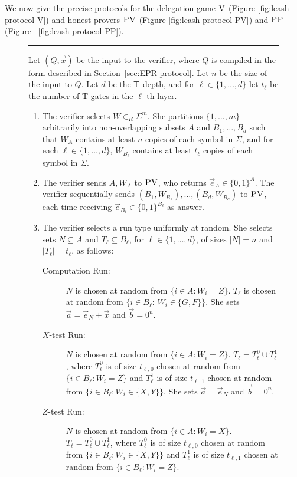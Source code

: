 We now give the precise protocols for the delegation game $\textsc{V}$ (Figure \ref{fig:leash-protocol-V})
and honest provers $\textsc{PV}$ (Figure \ref{fig:leash-protocol-PV}) and $\textsc{PP}$ (Figure~
\ref{fig:leash-protocol-PP}). 


\begin{figure}[H]
\rule{\textwidth}{0.5pt}
\justify 
Let $(Q,\vec{x})$ be the input to the verifier, where $Q$ is compiled in the form described in Section~\ref{sec:EPR-protocol}. Let $n$ be the size of the input to $Q$. Let $d$ be the $\sf T$-depth, and for $\ell\in\{1,\ldots,d\}$ let $t_\ell$ be the number of {\sf T} gates in the $\ell$-th layer. 
\begin{enumerate}
\item The verifier selects $W \in_R\Sigma^{m}$. She partitions $\{1,\ldots,m\}$ arbitrarily into non-overlapping subsets $A$ and $B_1,\ldots,B_d$ such that $W_A$ contains at least $n$ copies of each symbol in $\Sigma$, and for each $\ell\in\{1,\ldots,d\}$, $W_{B_\ell}$ contains at least $t_\ell$ copies of each symbol in $\Sigma$.
\item The verifier sends $A,W_A$ to $\textsc{PV}$, who returns $\vec{e}_A \in \{0,1\}^A$. The verifier sequentially sends  $(B_1,W_{B_1}),\ldots,(B_d,W_{B_d})$ to $\textsc{PV}$, each time receiving $\vec{e}_{B_\ell}\in \{0,1\}^{B_\ell}$ as answer. 
\item The verifier selects a run type uniformly at random. She selects sets $N \subseteq A$ and  $T_\ell \subseteq B_\ell$, for $\ell\in\{1,\ldots,d\}$, of sizes $|N|=n$ and $|T_\ell|=t_\ell$, as follows:
\begin{description}
\item[Computation Run:] $N$ is chosen at random from 
$\{i\in A: W_i=Z\}$. $T_\ell$ is chosen at random from $\{i\in B_\ell:\,W_i\in \{G,F\}\}$. 
She sets $\vec{a} = \vec{e}_N + \vec{x}$ and $\vec{b} = 0^n$.
\item[$X$-test Run:] $N$ is chosen at random from 
$\{i\in A:W_i=Z\}$. $T_\ell = T_\ell^0 \cup T_\ell^1$, where $T_\ell^0$ is of size $t_{\ell,0}$ chosen at random from $\{i\in B_\ell:W_i=Z\}$ and $T_\ell^1$ is of size $t_{\ell,1}$ chosen at random from $\{i\in B_\ell:W_i\in \{X,Y\}\}$.
She sets $\vec{a} = \vec{e}_N$ and $\vec{b} = 0^n$.
\item[$Z$-test Run:] $N$ is chosen at random from 
$\{i\in A:W_i=X\}$. $T_\ell = T_\ell^0 \cup T_\ell^1$, where $T_\ell^0$ is of size $t_{\ell,0}$ chosen at random from $\{i\in B_\ell:W_i\in\{X,Y\}\}$ and $T_\ell^1$ is of size $t_{\ell,1}$ chosen at random from $\{i\in B_\ell:W_i=Z\}$.

\end{description}
\end{enumerate}
\end{figure}
